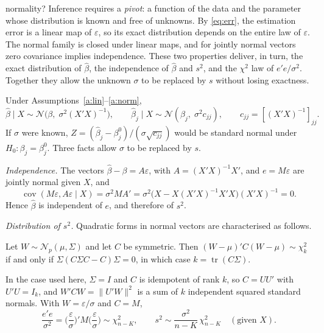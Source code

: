 \documentclass[11pt,a4paper]{article}
\newcommand{\N}{\mathcal{N}}
\newcommand{\Cov}{\operatorname{cov}}
\newcommand{\tr}{\operatorname{tr}}
\newcommand{\bh}{\hat\beta}
\begin{document}
\begin{whybox}{normality?}
Inference requires a \emph{pivot}: a function of the data and the parameter whose distribution is known and free of unknowns. By \eqref{eq:err}, the estimation error is a linear map of $\varepsilon$, so its exact distribution depends on the entire law of $\varepsilon$. The normal family is closed under linear maps, and for jointly normal vectors zero covariance implies independence. These two properties deliver, in turn, the exact distribution of $\bh$, the independence of $\bh$ and $s^2$, and the $\chi^2$ law of $e'e/\sigma^2$. Together they allow the unknown $\sigma$ to be replaced by $s$ without losing exactness.
\end{whybox}

Under Assumptions~\ref{a:lin}--\ref{a:norm},
\[
\bh\mid X\sim\N\big(\beta,\;\sigma^2(X'X)^{-1}\big),\qquad \bh_j\mid X\sim\N(\beta_j,\;\sigma^2c_{jj}),\qquad c_{jj}=[(X'X)^{-1}]_{jj}.
\]
If $\sigma$ were known, $Z=(\bh_j-\beta_j^0)/(\sigma\sqrt{c_{jj}})$ would be standard normal under $H_0\colon\beta_j=\beta_j^0$. Three facts allow $\sigma$ to be replaced by $s$.

\emph{Independence.} The vectors $\bh-\beta=A\varepsilon$, with $A=(X'X)^{-1}X'$, and $e=M\varepsilon$ are jointly normal given $X$, and
\[
\Cov(M\varepsilon,A\varepsilon\mid X)=\sigma^2MA'=\sigma^2\big(X-X(X'X)^{-1}X'X\big)(X'X)^{-1}=0 .
\]
Hence $\bh$ is independent of $e$, and therefore of $s^2$.

\emph{Distribution of $s^2$.} Quadratic forms in normal vectors are characterised as follows.

\begin{lemma}\label{lem:quad}
Let $W\sim\N_p(\mu,\Sigma)$ and let $C$ be symmetric. Then $(W-\mu)'C(W-\mu)\sim\chi^2_k$ if and only if $\Sigma(C\Sigma C-C)\Sigma=0$, in which case $k=\tr(C\Sigma)$.
\end{lemma}

In the case used here, $\Sigma=I$ and $C$ is idempotent of rank $k$, so $C=UU'$ with $U'U=I_k$, and $W'CW=\|U'W\|^2$ is a sum of $k$ independent squared standard normals. With $W=\varepsilon/\sigma$ and $C=M$,
\[
\frac{e'e}{\sigma^2}=\Big(\frac{\varepsilon}{\sigma}\Big)'M\Big(\frac{\varepsilon}{\sigma}\Big)\sim\chi^2_{n-K},\qquad s^2\sim\frac{\sigma^2}{n-K}\,\chi^2_{n-K}\quad(\text{given }X).
\]
\end{document}
